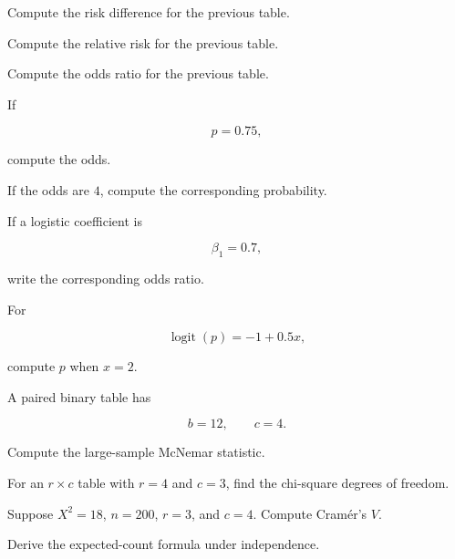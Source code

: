 \begin{exercise}[2]
Compute the risk difference for the previous table.
\end{exercise}

\begin{exercise}[2]
Compute the relative risk for the previous table.
\end{exercise}

\begin{exercise}[2]
Compute the odds ratio for the previous table.
\end{exercise}

\begin{exercise}[2]
If

\[
p=0.75,
\]

compute the odds.
\end{exercise}

\begin{exercise}[2]
If the odds are \(4\), compute the corresponding probability.
\end{exercise}

\begin{exercise}[2]
If a logistic coefficient is

\[
\beta_1=0.7,
\]

write the corresponding odds ratio.
\end{exercise}

\begin{exercise}[2]
For

\[
\operatorname{logit}(p)
=
-1+0.5x,
\]

compute \(p\) when \(x=2\).
\end{exercise}

\begin{exercise}[2]
A paired binary table has

\[
b=12,
\qquad
c=4.
\]

Compute the large-sample McNemar statistic.
\end{exercise}

\begin{exercise}[2]
For an \(r\times c\) table with \(r=4\) and \(c=3\), find the
chi-square degrees of freedom.
\end{exercise}

\begin{exercise}[2]
Suppose \(X^2=18\), \(n=200\), \(r=3\), and \(c=4\). Compute
Cramér's \(V\).
\end{exercise}

\begin{exercise}[3]
Derive the expected-count formula under independence.
\end{exercise}

